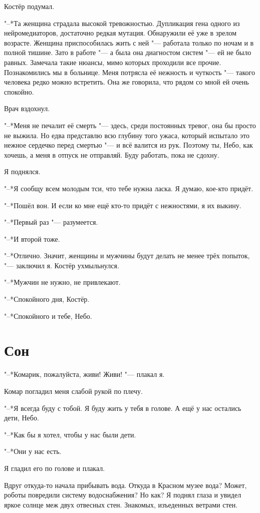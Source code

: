 \documentclass[a4paper,10pt]{book}
\newcommand{\ldotst}{\so{...}\xspace}
\begin{document}
Костёр подумал.

"--*Та женщина страдала высокой тревожностью. Дупликация гена одного из 
нейромедиаторов, достаточно редкая мутация. Обнаружили её уже в зрелом 
возрасте. Женщина приспособилась жить с ней "--- работала только по ночам и в 
полной тишине. Зато в работе "--- а была она диагностом систем "--- ей не было 
равных. Замечала такие нюансы, мимо которых проходили все прочие. Познакомились 
мы в больнице. Меня потрясла её нежность и чуткость "--- такого человека редко 
можно встретить. Она же говорила, что рядом со мной ей очень спокойно.

Врач вздохнул.

"--*Меня не печалит её смерть "--- здесь, среди постоянных тревог, она бы 
просто не выжила. Но едва представлю всю глубину того ужаса, который испытало 
это нежное сердечко перед смертью "--- и всё валится из рук. Поэтому ты, Небо, 
как хочешь, а меня в отпуск не отправляй. Буду работать, пока не сдохну.

Я поднялся.

"--*Я сообщу всем молодым тси, что тебе нужна ласка. Я думаю, кое-кто придёт.

"--*Пошёл вон. И если ко мне ещё кто-то придёт с нежностями, я их выкину.

"--*Первый раз "--- разумеется.

"--*И второй тоже.

"--*Отлично. Значит, женщины и мужчины будут делать не менее трёх попыток, "--- 
заключил я. Костёр ухмыльнулся.

"--*Мужчин не нужно, не привлекают.

"--*Спокойного дня, Костёр.

"--*Спокойного и тебе, Небо.
 
\section{Сон}

"--*Комарик, пожалуйста, живи! Живи! "--- плакал я.

Комар погладил меня слабой рукой по плечу.

"--*Я всегда буду с тобой. Я буду жить у тебя в голове. А ещё у нас остались 
дети, Небо.

"--*Как бы я хотел, чтобы у нас были дети.

"--*Они у нас есть.

Я гладил его по голове и плакал.

Вдруг откуда-то начала прибывать вода. Откуда в Красном музее вода? Может, 
роботы повредили систему водоснабжения? Но как? Я поднял глаза\ldotst и увидел 
яркое солнце меж двух отвесных стен. Знакомых, изъеденных ветрами стен.
\end{document}
